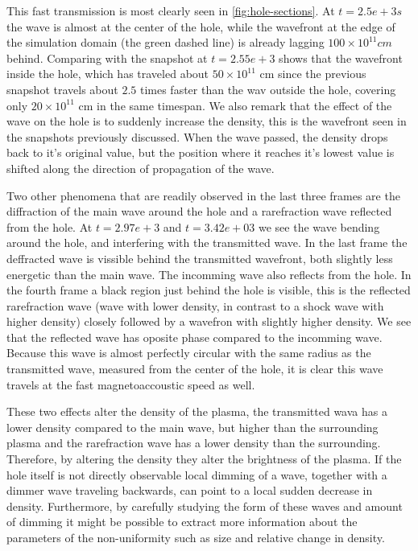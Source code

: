 This fast transmission is most clearly seen in \cref{fig:hole-sections}. 
At $t=2.5e+3 s$ the wave is almost at the center of the hole, while the wavefront at the edge of the simulation domain (the green dashed line) is already lagging $100\times10^{11} cm$ behind.
Comparing with the snapshot at $t=2.55e+3$ shows that the wavefront inside the hole, which has traveled about $50\times10^{11}$ cm since the previous snapshot travels about $2.5$ times faster than the wav outside the hole, covering only $20\times10^{11}$ cm in the same timespan.
We also remark that the effect of the wave on the hole is to suddenly increase the density, this is the wavefront seen in the snapshots previously discussed.
When the wave passed, the density drops back to it's original value, but the position where it reaches it's lowest value is shifted along the direction of propagation of the wave.

Two other phenomena that are readily observed in the last three frames are the diffraction of the main wave around the hole and a rarefraction wave reflected from the hole.
At $t=2.97e+3$ and $t=3.42e+03$ we see the wave bending around the hole, and interfering with the transmitted wave.
In the last frame the deffracted wave is vissible behind the transmitted wavefront, both slightly less energetic than the main wave.
The incomming wave also reflects from the hole.
In the fourth frame a black region just behind the hole is visible, this is the reflected rarefraction wave (wave with lower density, in contrast to a shock wave with higher density) closely followed by a wavefron with slightly higher density.
We see that the reflected wave has oposite phase compared to the incomming wave.
Because this wave is almost perfectly circular with the same radius as the transmitted wave, measured from the center of the hole, it is clear this wave travels at the fast magnetoaccoustic speed as well.

These two effects alter the density of the plasma, the transmitted wava has a lower density compared to the main wave, but higher than the surrounding plasma and the rarefraction wave has a lower density than the surrounding.
Therefore, by altering the density they alter the brightness of the plasma. 
If the hole itself is not directly observable local dimming of a wave, together with a dimmer wave traveling backwards, can point to a local sudden decrease in density.
Furthermore, by carefully studying the form of these waves and amount of dimming it might be possible to extract more information about the parameters of the non-uniformity such as size and relative change in density.

